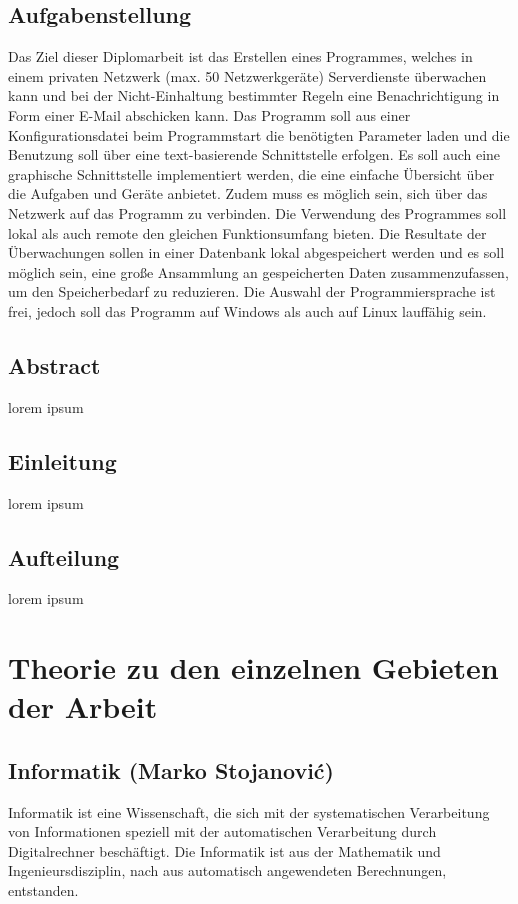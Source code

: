 \documentclass[12pt,a4paper]{report}
\begin{document}
\pagestyle{fancy}
\begin{onehalfspace}
\chapter{Aufgabenstellung}

Das Ziel dieser Diplomarbeit ist das Erstellen eines Programmes, welches in einem privaten Netzwerk (max. 50 Netzwerkgeräte) Serverdienste überwachen kann und bei der Nicht-Einhaltung bestimmter Regeln eine Benachrichtigung in Form einer E-Mail abschicken kann. Das Programm soll aus einer Konfigurationsdatei beim Programmstart die benötigten Parameter laden und die Benutzung soll über eine text-basierende Schnittstelle erfolgen. Es soll auch eine graphische Schnittstelle implementiert werden, die eine einfache Übersicht über die Aufgaben und Geräte anbietet. Zudem muss es möglich sein, sich über das Netzwerk auf das Programm zu verbinden. Die Verwendung des Programmes soll lokal als auch remote den gleichen Funktionsumfang bieten.
Die Resultate der Überwachungen sollen in einer Datenbank lokal abgespeichert werden und es soll möglich sein, eine große Ansammlung an gespeicherten Daten zusammenzufassen, um den Speicherbedarf zu reduzieren. Die Auswahl der Programmiersprache ist frei, jedoch soll das Programm auf Windows als auch auf Linux lauffähig sein.

\chapter{Abstract}
lorem ipsum
\chapter{Einleitung}
lorem ipsum
\chapter{Aufteilung}
lorem ipsum 

\part{Theorie zu den einzelnen Gebieten der Arbeit}
\chapter{Informatik (Marko Stojanovi\'{c})}
Informatik ist eine Wissenschaft, die sich mit der systematischen Verarbeitung von Informationen speziell mit der automatischen Verarbeitung durch Digitalrechner beschäftigt. Die Informatik ist aus der Mathematik und Ingenieursdisziplin, nach aus automatisch angewendeten Berechnungen, entstanden.


\end{onehalfspace}
\end{document}
